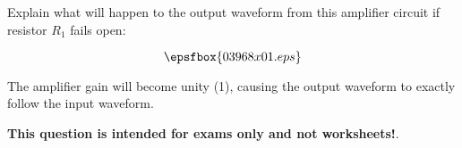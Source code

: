 

Explain what will happen to the output waveform from this amplifier circuit if resistor $R_1$ fails open:

$$\epsfbox{03968x01.eps}$$







The amplifier gain will become unity (1), causing the output waveform to exactly follow the input waveform.







{\bf This question is intended for exams only and not worksheets!}.



